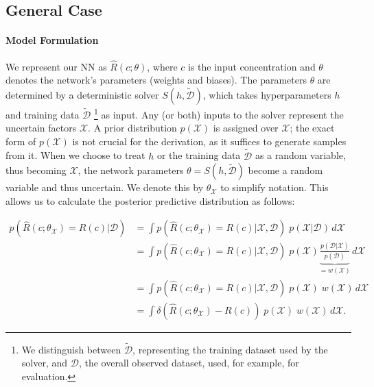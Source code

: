 \subsection{General Case}

\paragraph{Model Formulation}
We represent our NN as $\hat{R}(c;\theta)$, where $c$ is the input concentration and $\theta$ denotes the network's parameters (weights and biases). The parameters $\theta$ are determined by a deterministic solver $S(h, \tilde{\mathcal{D}})$, which takes hyperparameters $h$ and training data $\tilde{\mathcal{D}}$ \footnote{We distinguish between $\tilde{\mathcal{D}}$, representing the training dataset used by the solver, and $\mathcal{D}$, the overall observed dataset, used, for example, for evaluation.} as input. Any (or both) inputs to the solver represent the uncertain factors $\mathcal{X}$. A prior distribution $p(\mathcal{X})$ is assigned over $\mathcal{X}$; the exact form of $p(\mathcal{X})$ is not crucial for the derivation, as it suffices to generate samples from it.
When we choose to treat $h$ or the training data $\tilde{\mathcal{D}}$ as a random variable, thus becoming $\mathcal{X}$, the network parameters $\theta = S(h, \tilde{\mathcal{D}})$ become a random variable and thus uncertain. We denote this by $\theta_{\mathcal{X}}$ to simplify notation.
This allows us to calculate the posterior predictive distribution as follows:

\begin{align*}
p(\hat{R}(c;\theta_{\mathcal{X}}) = R(c)| \mathcal{D}) &= \int p(\hat{R}(c;\theta_{\mathcal{X}}) = R(c) | \mathcal{X}, \mathcal{D})\; p(\mathcal{X} | \mathcal{D}) \, d\mathcal{X} \\
                                          &= \int p(\hat{R}(c;\theta_{\mathcal{X}}) = R(c) | \mathcal{X}, \mathcal{D})\; p(\mathcal{X}) \underbrace{\frac{p(\mathcal{D} | \mathcal{X}) }{p(\mathcal{D})}}_{= w(\mathcal{X})} \, d\mathcal{X} \\
                                          &= \int p(\hat{R}(c;\theta_{\mathcal{X}}) = R(c) | \mathcal{X}, \mathcal{D})\; p(\mathcal{X})\; w(\mathcal{X}) \, d\mathcal{X} \\
                                          &= \int \delta(\hat{R}(c;\theta_{\mathcal{X}}) - R(c))\; p(\mathcal{X})\; w(\mathcal{X}) \, d\mathcal{X} .
\end{align*}

